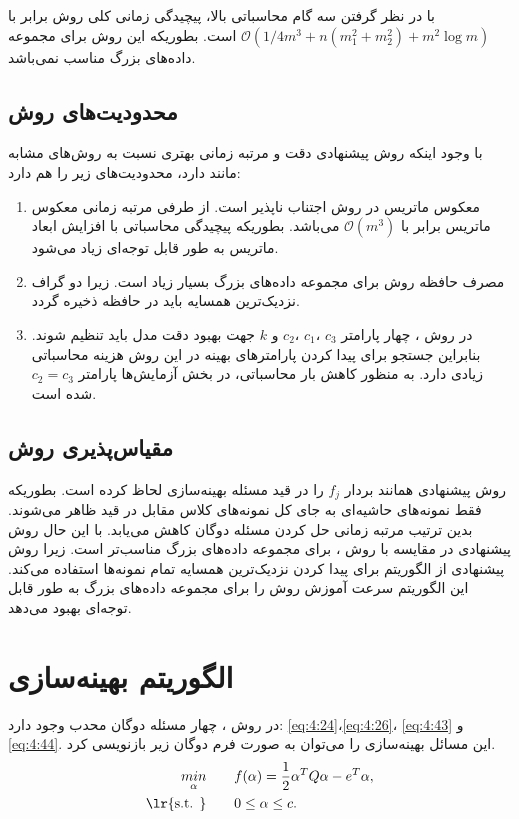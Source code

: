 با در نظر گرفتن سه گام محاسباتی بالا، پیچیدگی زمانی کلی روش  برابر با  $\mathcal{O}(1/4m^{3} + n(m^{2}_{1} + m^{2}_{2}) + m^{2}\log{m})$ است. بطوریکه این روش برای مجموعه داده‌های بزرگ مناسب نمی‌باشد.

\subsection{محدودیت‌های روش }\label{sec:4:6:3}
با وجود اینکه روش پیشنهادی دقت و مرتبه زمانی بهتری نسبت به روش‌های مشابه مانند  دارد، محدودیت‌های زیر را هم دارد:
\begin{enumerate}
	\item معکوس ماتریس در روش  اجتناب ناپذیر است. از طرفی مرتبه زمانی معکوس ماتریس برابر با  $\mathcal{O}(m^{3})$ می‌باشد. بطوریکه پیچیدگی محاسباتی با افزایش ابعاد ماتریس به طور قابل توجه‌ای زیاد می‌شود.
	\item مصرف حافظه روش  برای مجموعه داده‌های بزرگ بسیار زیاد است. زیرا دو گراف نزدیک‌ترین همسایه باید در حافظه ذخیره گردد.
	\item در روش ، چهار پارامتر $c_{3}$ ،$c_{1}$  ،$c_{2}$   و  $k$ جهت بهبود دقت مدل باید تنظیم شوند. بنابراین جستجو برای پیدا کردن پارامترهای بهینه در این روش هزینه محاسباتی زیادی دارد. به منظور کاهش بار محاسباتی، در بخش آزمایش‌ها پارامتر $c_{2} = c_{3}$  شده است.
\end{enumerate}

\subsection{مقیاس‌پذیری روش }\label{sec:4:6:4}
روش پیشنهادی همانند  بردار  $f_{j}$ را در قید مسئله بهینه‌سازی لحاظ کرده است. بطوریکه فقط نمونه‌های حاشیه‌ای به جای کل نمونه‌های کلاس مقابل در قید ظاهر می‌شوند. بدین ترتیب مرتبه زمانی حل کردن مسئله دوگان کاهش می‌یابد. با این حال روش پیشنهادی در مقایسه با روش ، برای مجموعه داده‌های بزرگ مناسب‌تر است. زیرا روش پیشنهادی از الگوریتم  برای پیدا کردن نزدیک‌ترین همسایه تمام نمونه‌ها استفاده می‌کند. این الگوریتم سرعت آموزش روش  را برای مجموعه داده‌های بزرگ به طور قابل توجه‌ای بهبود می‌دهد.

\section{الگوریتم بهینه‌سازی }\label{sec:4:7}
در روش ، چهار مسئله دوگان محدب وجود دارد: \ref{eq:4:24}،\ref{eq:4:26}، \ref{eq:4:43} و \ref{eq:4:44}. این مسائل بهینه‌سازی را می‌توان به صورت فرم دوگان زیر بازنویسی کرد.
\begin{equation}\label{eq:4:47}
\begin{split}
\mathop{{ min}}\limits_{\alpha} \qquad & f(\alpha)=\frac{1}{2} \alpha^{T}Q\alpha - e^{T}\alpha, \\
\textrm{\lr{s.t. }} \qquad & 0 \leq \alpha \leq c.
\end{split}
\end{equation}

